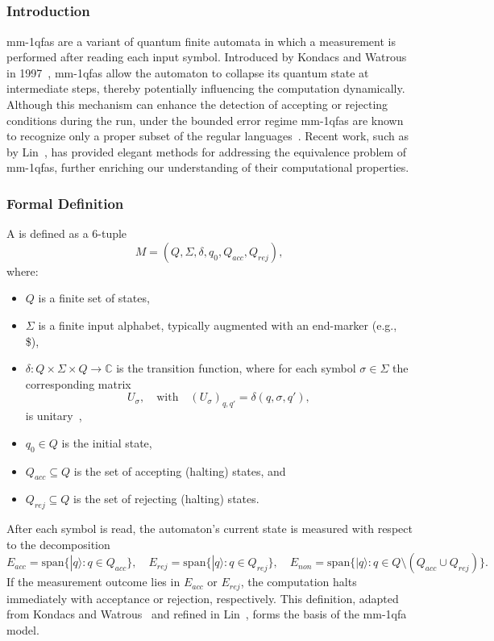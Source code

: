 \subsection{}
\label{sec:mmqfa}

\subsubsection{Introduction}
\glspl{mm-1qfa} are a variant of quantum finite automata in which a measurement is performed after reading each input symbol. Introduced by Kondacs and Watrous in 1997~\cite{kondacs1997power}, \glspl{mm-1qfa} allow the automaton to collapse its quantum state at intermediate steps, thereby potentially influencing the computation dynamically. Although this mechanism can enhance the detection of accepting or rejecting conditions during the run, under the bounded error regime \glspl{mm-1qfa} are known to recognize only a proper subset of the regular languages~\cite{brodsky2002characterizations}. Recent work, such as by Lin~\cite{lin2012another}, has provided elegant methods for addressing the equivalence problem of \glspl{mm-1qfa}, further enriching our understanding of their computational properties.

\subsubsection{Formal Definition}
A  is defined as a 6-tuple
\[
M = (Q,\Sigma,\delta,q_0,Q_{acc},Q_{rej}),
\]
where:
\begin{itemize}
    \item $Q$ is a finite set of states,
    \item $\Sigma$ is a finite input alphabet, typically augmented with an end-marker (e.g., \$),
    \item $\delta : Q \times \Sigma \times Q \to \mathbb{C}$ is the transition function, where for each symbol $\sigma\in\Sigma$ the corresponding matrix 
    \[
    U_\sigma,\quad \text{with} \quad (U_\sigma)_{q,q'}=\delta(q,\sigma,q'),
    \]
    is unitary~\cite{kondacs1997power},
    \item $q_0 \in Q$ is the initial state,
    \item $Q_{acc} \subseteq Q$ is the set of accepting (halting) states, and
    \item $Q_{rej} \subseteq Q$ is the set of rejecting (halting) states.
\end{itemize}
After each symbol is read, the automaton's current state is measured with respect to the decomposition
\[
E_{acc} = \text{span}\{|q\rangle : q \in Q_{acc}\},\quad
E_{rej} = \text{span}\{|q\rangle : q \in Q_{rej}\},\quad
E_{non} = \text{span}\{|q\rangle : q \in Q \setminus (Q_{acc}\cup Q_{rej})\}.
\]
If the measurement outcome lies in $E_{acc}$ or $E_{rej}$, the computation halts immediately with acceptance or rejection, respectively. This definition, adapted from Kondacs and Watrous~\cite{kondacs1997power} and refined in Lin~\cite{lin2012another}, forms the basis of the \gls{mm-1qfa} model.

